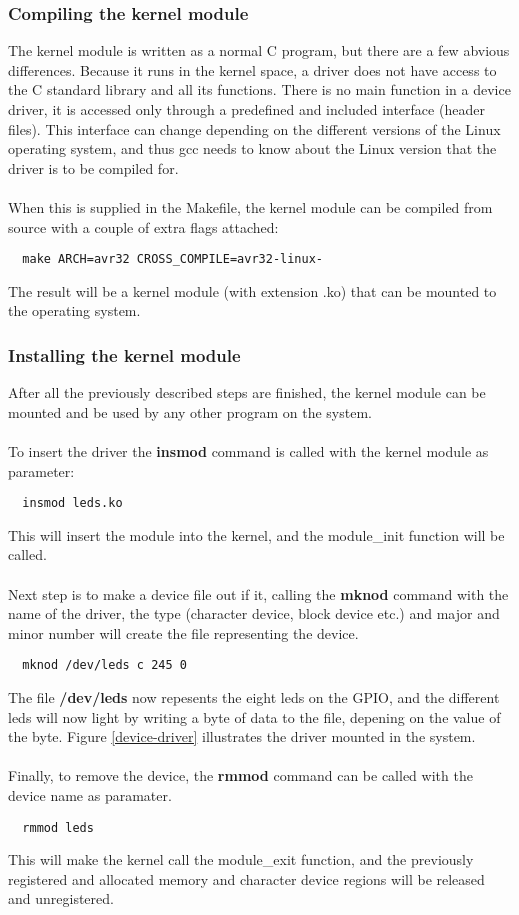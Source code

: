 \subsubsection{Compiling the kernel module}
The kernel module is written as a normal C program, but there are a few
abvious differences. Because it runs in the kernel space, a driver
does not have access to the C standard library and all its functions.
There is no main function in a device driver, it is accessed only
through a predefined and included interface (header files). 
This interface can change
depending on the different versions of the Linux operating system, and
thus gcc needs to know about the Linux version that the driver is to be
compiled for.\\
\\
When this is supplied in the Makefile, the kernel module can be compiled
from source with a couple of extra flags attached:
\begin{verbatim}
  make ARCH=avr32 CROSS_COMPILE=avr32-linux-
\end{verbatim}
The result will be a kernel module (with extension .ko) that can be
mounted to the operating system.

\subsubsection{Installing the kernel module}
After all the previously described steps are finished, the kernel
module can be mounted and be used by any other program on the system.\\
\\
To insert the driver the \textbf{insmod} command is called with the
kernel module as parameter:
\begin{verbatim}
  insmod leds.ko
\end{verbatim}
This will insert the module into the kernel, and the module\_init
function will be called.\\
\\
Next step is to make a device file out if it, calling the
\textbf{mknod} command with the name of the driver,
the type (character device, block device etc.)
and major and minor number will create the file representing the device.
\begin{verbatim}
  mknod /dev/leds c 245 0
\end{verbatim}
The file \textbf{/dev/leds} now repesents the eight leds on the GPIO,
and the different leds will now light by writing a byte
of data to the file, depening on the value of the byte.
Figure \ref{device-driver} illustrates the driver mounted in the
system.\\
\\
Finally, to remove the device, the \textbf{rmmod} command can be called
with the device name as paramater.
\begin{verbatim}
  rmmod leds
\end{verbatim}
This will make the kernel call the module\_exit function, and the
previously registered and allocated memory and character device regions
will be released and unregistered.
